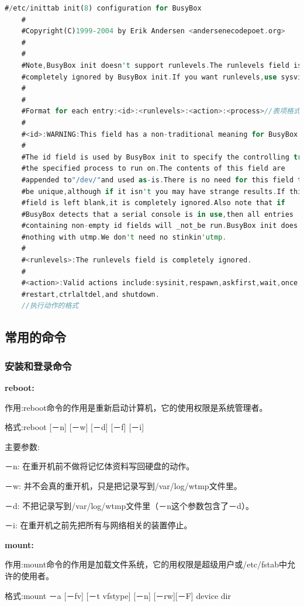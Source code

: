 \begin{lstlisting}[language=Rust]
	#/etc/inittab init(8) configuration for BusyBox
	#
	#Copyright(C)1999-2004 by Erik Andersen <andersenecodepoet.org>
	#
	#
	#Note,BusyBox init doesn't support runlevels.The runlevels field is
	#completely ignored by BusyBox init.If you want runlevels,use sysvinit.
	#
	#
	#Format for each entry:<id>:<runlevels>:<action>:<process>//表项格式
	#
	#<id>:WARNING:This field has a non-traditional meaning for BusyBox init!
	#
	#The id field is used by BusyBox init to specify the controlling try for
	#the specified process to run on.The contents of this field are
	#appended to"/dev/"and used as-is.There is no need for this field to
	#be unique,although if it isn't you may have strange results.If this
	#field is left blank,it is completely ignored.Also note that if
	#BusyBox detects that a serial console is in use,then all entries
	#containing non-empty id fields will _not_be run.BusyBox init does
	#nothing with utmp.We don't need no stinkin'utmp.
	#
	#<runlevels>:The runlevels field is completely ignored.
	#
	#<action>:Valid actions include:sysinit,respawn,askfirst,wait,once,
	#restart,ctrlaltdel,and shutdown.
	//执行动作的格式
\end{lstlisting}

\subsection{常用的命令}
\subsubsection{安装和登录命令}
\textbf{reboot:}

作用:reboot命令的作用是重新启动计算机，它的使用权限是系统管理者。

格式:reboot [－n] [－w] [－d] [－f] [－i]

主要参数:

－n: 在重开机前不做将记忆体资料写回硬盘的动作。

－w: 并不会真的重开机，只是把记录写到/var/log/wtmp文件里。

－d: 不把记录写到/var/log/wtmp文件里（－n这个参数包含了－d）。

－i: 在重开机之前先把所有与网络相关的装置停止。

\textbf{mount:}

作用:mount命令的作用是加载文件系统，它的用权限是超级用户或/etc/fstab中允许的使用者。

格式:mount －a [－fv] [－t vfstype] [－n] [－rw][－F] device dir

